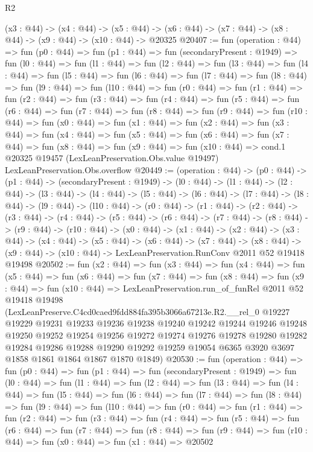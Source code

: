 \begin{lexlean}{R2}
\begin{coremodule}
  (x3 : @44) ->
  (x4 : @44) ->
  (x5 : @44) -> (x6 : @44) -> (x7 : @44) -> (x8 : @44) -> (x9 : @44) -> (x10 : @44) -> @20325
@20407 := fun (operation : @44) =>
  fun (p0 : @44) =>
  fun (p1 : @44) =>
  fun (secondaryPresent : @1949) =>
  fun (l0 : @44) =>
  fun (l1 : @44) =>
  fun (l2 : @44) =>
  fun (l3 : @44) =>
  fun (l4 : @44) =>
  fun (l5 : @44) =>
  fun (l6 : @44) =>
  fun (l7 : @44) =>
  fun (l8 : @44) =>
  fun (l9 : @44) =>
  fun (l10 : @44) =>
  fun (r0 : @44) =>
  fun (r1 : @44) =>
  fun (r2 : @44) =>
  fun (r3 : @44) =>
  fun (r4 : @44) =>
  fun (r5 : @44) =>
  fun (r6 : @44) =>
  fun (r7 : @44) =>
  fun (r8 : @44) =>
  fun (r9 : @44) =>
  fun (r10 : @44) =>
  fun (x0 : @44) =>
  fun (x1 : @44) =>
  fun (x2 : @44) =>
  fun (x3 : @44) =>
  fun (x4 : @44) =>
  fun (x5 : @44) =>
  fun (x6 : @44) =>
  fun (x7 : @44) =>
  fun (x8 : @44) =>
  fun (x9 : @44) =>
  fun (x10 : @44) =>
  cond.{1} @20325 @19457 (LexLeanPreservation.Obs.value @19497) LexLeanPreservation.Obs.overflow
@20449 := (operation : @44) ->
  (p0 : @44) ->
  (p1 : @44) ->
  (secondaryPresent : @1949) ->
  (l0 : @44) ->
  (l1 : @44) ->
  (l2 : @44) ->
  (l3 : @44) ->
  (l4 : @44) ->
  (l5 : @44) ->
  (l6 : @44) ->
  (l7 : @44) ->
  (l8 : @44) ->
  (l9 : @44) ->
  (l10 : @44) ->
  (r0 : @44) ->
  (r1 : @44) ->
  (r2 : @44) ->
  (r3 : @44) ->
  (r4 : @44) ->
  (r5 : @44) ->
  (r6 : @44) ->
  (r7 : @44) ->
  (r8 : @44) ->
  (r9 : @44) ->
  (r10 : @44) ->
  (x0 : @44) ->
  (x1 : @44) ->
  (x2 : @44) ->
  (x3 : @44) ->
  (x4 : @44) ->
  (x5 : @44) ->
  (x6 : @44) ->
  (x7 : @44) ->
  (x8 : @44) -> (x9 : @44) -> (x10 : @44) -> LexLeanPreservation.RunConv @2011 @52 @19418 @19498
@20502 := fun (x2 : @44) =>
  fun (x3 : @44) =>
  fun (x4 : @44) =>
  fun (x5 : @44) =>
  fun (x6 : @44) =>
  fun (x7 : @44) =>
  fun (x8 : @44) =>
  fun (x9 : @44) =>
  fun (x10 : @44) =>
  LexLeanPreservation.run_of_funRel
    @2011
    @52
    @19418
    @19498
    (LexLeanPreserve.C4cd0caed9fdd884fa395b3066a67213e.R2.__rel_0
      @19227
      @19229
      @19231
      @19233
      @19236
      @19238
      @19240
      @19242
      @19244
      @19246
      @19248
      @19250
      @19252
      @19254
      @19256
      @19272
      @19274
      @19276
      @19278
      @19280
      @19282
      @19284
      @19286
      @19288
      @19290
      @19292
      @19259
      @19054
      @6365
      @3920
      @3697
      @1858
      @1861
      @1864
      @1867
      @1870
      @1849)
@20530 := fun (operation : @44) =>
  fun (p0 : @44) =>
  fun (p1 : @44) =>
  fun (secondaryPresent : @1949) =>
  fun (l0 : @44) =>
  fun (l1 : @44) =>
  fun (l2 : @44) =>
  fun (l3 : @44) =>
  fun (l4 : @44) =>
  fun (l5 : @44) =>
  fun (l6 : @44) =>
  fun (l7 : @44) =>
  fun (l8 : @44) =>
  fun (l9 : @44) =>
  fun (l10 : @44) =>
  fun (r0 : @44) =>
  fun (r1 : @44) =>
  fun (r2 : @44) =>
  fun (r3 : @44) =>
  fun (r4 : @44) =>
  fun (r5 : @44) =>
  fun (r6 : @44) =>
  fun (r7 : @44) =>
  fun (r8 : @44) => fun (r9 : @44) => fun (r10 : @44) => fun (x0 : @44) => fun (x1 : @44) => @20502
\end{coremodule}
\end{lexlean}
